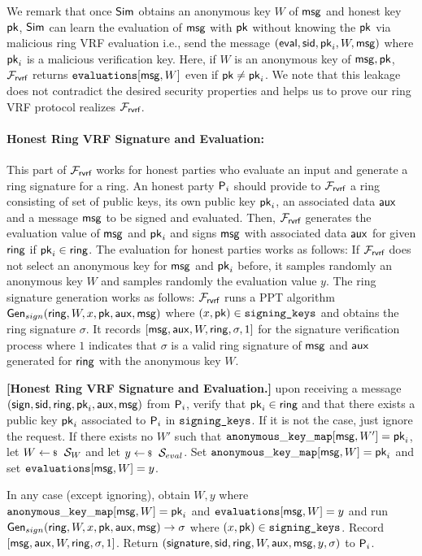 We remark that once $ \mathsf{Sim} $ obtains an anonymous key $ W $ of  $ \mathsf{msg} $  and honest key $ \mathsf{pk} $,  $ \mathsf{Sim} $ can learn the  evaluation of  $ \mathsf{msg} $ with $ \mathsf{pk} $ without knowing the $ \mathsf{pk} $ via malicious ring VRF evaluation i.e., send the message $ (\mathsf{eval}, \textsf{sid}, \mathsf{pk}_i,W,\mathsf{msg}) $ where $ \mathsf{pk}_i $ is a malicious verification key. Here, if $ W $ is an anonymous key of $ \mathsf{msg}, \mathsf{pk}  $, $ \mathcal{F}_{\textsf{rvrf}} $ returns $ \texttt{evaluations}[\mathsf{msg}, W] $ even if $ \mathsf{pk} \neq \mathsf{pk}_i $. We note that this leakage does not contradict the desired security properties and helps us to prove our ring VRF protocol realizes $ \mathcal{F}_{\textsf{rvrf}} $.  


\paragraph{Honest Ring VRF Signature and Evaluation:} This part of $ \mathcal{F}_{\textsf{rvrf}} $ works for honest parties who evaluate an input and generate a ring signature for a ring. An honest party $ \mathsf{P}_i $ should provide to $ \mathcal{F}_{\textsf{rvrf}} $ a ring consisting of set of public keys, its own public key $ \mathsf{pk}_i $,  an associated data $ \mathsf{aux} $ and a message $ \mathsf{msg} $ to be signed and evaluated. Then, $ \mathcal{F}_{\textsf{rvrf}} $ generates the evaluation value of $ \mathsf{msg} $ and $ \mathsf{pk}_i $ and signs $ \mathsf{msg} $ with associated data $ \mathsf{aux} $ for given $ \mathsf{ring} $ if $ \mathsf{pk}_i \in \mathsf{ring} $. The evaluation for honest parties works as follows: If $ \mathcal{F}_{\textsf{rvrf}} $ does not select an anonymous key for $ \mathsf{msg} $ and $ \mathsf{pk}_i $ before, it samples randomly an anonymous key $ W $ and samples randomly the evaluation value $ y $. The ring signature generation works as follows:  $ \mathcal{F}_{\textsf{rvrf}} $ runs a PPT algorithm $ \mathsf{Gen}_{sign}(\mathsf{ring}, W, x,\mathsf{pk},\mathsf{aux},\mathsf{msg}) $ where $ (x,\mathsf{pk}) \in \texttt{signing\_keys} $ and obtains the ring signature $ \sigma $. It records $  [\mathsf{msg},\mathsf{aux}, W, \mathsf{ring},\sigma, 1]  $ for the signature verification process where $ 1 $ indicates that $ \sigma  $ is a valid ring signature of $ \mathsf{msg} $ and $ \mathsf{aux} $ generated for $ \mathsf{ring} $ with the anonymous key $ W $.

\begin{tcolorbox}[left=2pt,right=2pt]
	\textbf{[Honest Ring VRF Signature and Evaluation.]} upon receiving a message $(\mathsf{sign}, \textsf{sid}, \mathsf{ring}, \mathsf{pk}_i,\mathsf{aux}, \mathsf{msg})$ from $\mathsf{P}_i$, verify that $\mathsf{pk}_i \in \mathsf{ring}$ and that there exists a public key $\mathsf{pk}_i$ associated to $\mathsf{P}_i$ in $ \texttt{signing\_keys} $. If it is not the case, just ignore the request. 	
	If there exists no $ W' $ such that $ \mathtt{anonymous\_key\_map}[\mathsf{msg},W'] =  \mathsf{pk}_i $, let $ W \leftsample \setsym{S}_W $ and let $y \leftsample \setsym{S}_{eval}$. Set $ \mathtt{anonymous\_key\_map}[\mathsf{msg},W] = \mathsf{pk}_i $ and set $ \texttt{evaluations}[\mathsf{msg}, W] = y$.
	
	In any case (except ignoring), obtain $ W, y $ where $ \mathtt{anonymous\_key\_map}[\mathsf{msg},W] =\mathsf{pk}_i $ and $ \texttt{evaluations}[\mathsf{msg}, W] = y$  and run  $ \mathsf{Gen}_{sign}(\mathsf{ring}, W,x,\mathsf{pk},\mathsf{aux},\mathsf{msg}) \rightarrow \sigma $ where $ (x, \mathsf{pk}) \in \texttt{signing\_keys} $. 
	Record $ [\mathsf{msg},\mathsf{aux}, W, \mathsf{ring},\sigma, 1] $. Return $(\mathsf{signature}, \textsf{sid}, \mathsf{ring},W,\mathsf{aux},\mathsf{msg}, y, \sigma )$ to $\mathsf{P}_i$.
\end{tcolorbox}


